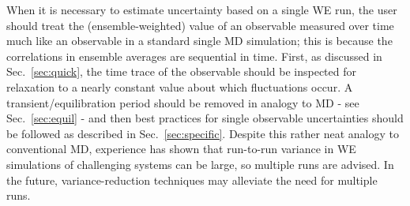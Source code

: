 When it is necessary to estimate uncertainty based on a single WE run, the user should treat the (ensemble-weighted) value of an observable measured over time much like an observable in a standard single MD simulation; this is because the correlations in ensemble averages are sequential in time.
First, as discussed in Sec.\ \ref{sec:quick}, the time trace of the observable should be inspected for relaxation to a nearly constant value about which fluctuations occur.
A transient/equilibration period should be removed in analogy to MD - see Sec.\ \ref{sec:equil} - and then best practices for single observable uncertainties should be followed as described in Sec.\ \ref{sec:specific}.
Despite this rather neat analogy to conventional MD, experience has shown that run-to-run variance in WE simulations of challenging systems can be  large, so multiple runs are  advised.  In the future, variance-reduction techniques may alleviate the need for multiple runs.
